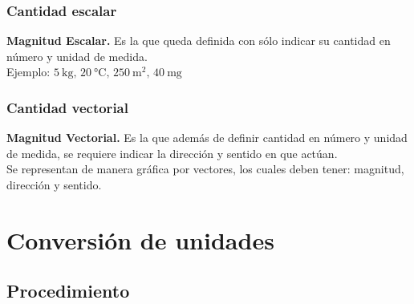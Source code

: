 \documentclass[12pt]{beamer}
\begin{document}
\begin{frame}
\frametitle{Cantidad escalar}
\textbf{Magnitud Escalar.} Es la que queda definida con sólo indicar su cantidad en número y unidad de medida.
\\
\bigskip
\pause
Ejemplo: $\SI{5}{\kilo\gram},\, \SI{20}{\degreeCelsius}, \, \SI{250}{\square\metre}, \, \SI{40}{\milli\gram}$
\end{frame}
\begin{frame}
\frametitle{Cantidad vectorial}
\textbf{Magnitud Vectorial.} Es la que además de definir cantidad en número y unidad de medida, se requiere indicar la dirección y sentido en que actúan.
\\
\bigskip
\pause
Se representan de manera gráfica por vectores, los cuales deben tener: magnitud, dirección y sentido.
\end{frame}

\section{Conversión de unidades}
\subsection{Procedimiento}
\end{document}
